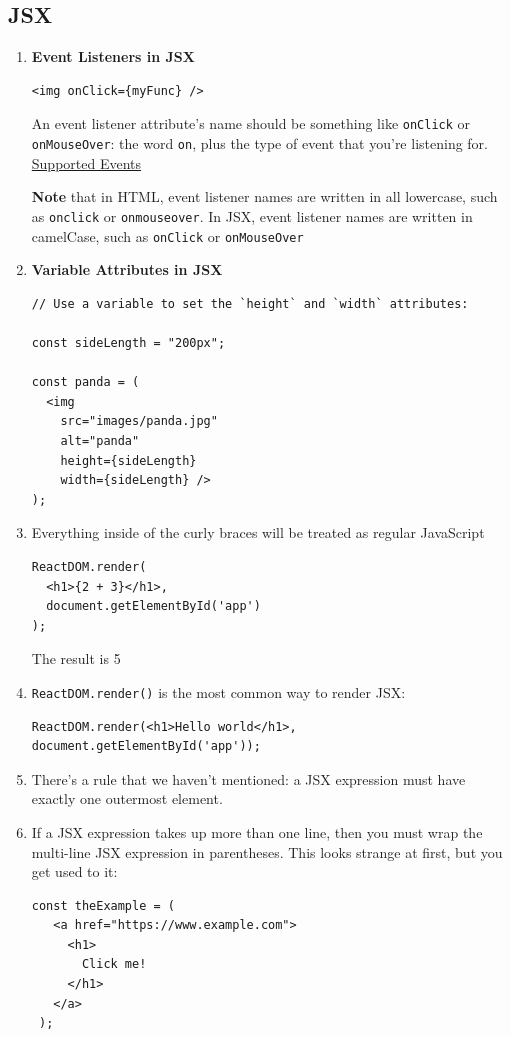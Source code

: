\documentclass[a4paper, 12pt]{article}
\begin{document}
\subsection{JSX}
\begin{enumerate}

\item \textbf{Event Listeners in JSX}
\begin{verbatim}
<img onClick={myFunc} />
\end{verbatim}
An event listener attribute's name should be something like \verb|onClick| or \verb|onMouseOver|: the word \verb|on|, plus the type of event that you're listening for. \href{https://reactjs.org/docs/events.html#supported-events}{Supported Events}

\textbf{Note} that in HTML, event listener names are written in all lowercase, such as \verb|onclick| or \verb|onmouseover|. In JSX, event listener names are written in camelCase, such as \verb|onClick| or \verb|onMouseOver|

\item \textbf{Variable Attributes in JSX}
\begin{verbatim}
// Use a variable to set the `height` and `width` attributes:

const sideLength = "200px";

const panda = (
  <img 
    src="images/panda.jpg" 
    alt="panda" 
    height={sideLength} 
    width={sideLength} />
);
\end{verbatim}

\item Everything inside of the curly braces will be treated as regular JavaScript
\begin{verbatim}
ReactDOM.render(
  <h1>{2 + 3}</h1>,
  document.getElementById('app')
);
\end{verbatim}
The result is 5

\item \verb|ReactDOM.render()| is the most common way to render JSX:
\begin{verbatim}
ReactDOM.render(<h1>Hello world</h1>, document.getElementById('app'));
\end{verbatim}

\item There's a rule that we haven't mentioned: a JSX expression must have exactly one outermost element.

\item If a JSX expression takes up more than one line, then you must wrap the multi-line JSX expression in parentheses. This looks strange at first, but you get used to it:
\begin{verbatim}
const theExample = (
   <a href="https://www.example.com">
     <h1>
       Click me!
     </h1>
   </a>
 );
\end{verbatim}


\end{enumerate}
\end{document}

